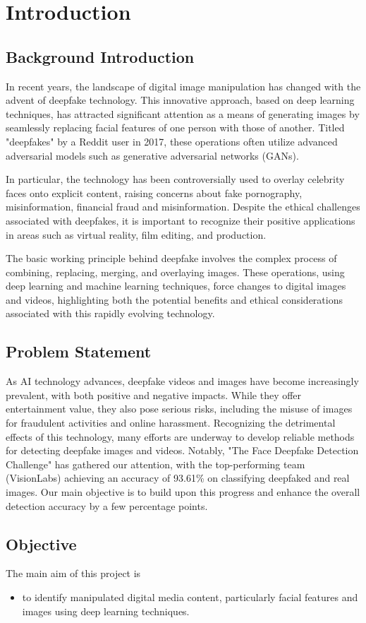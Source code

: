 \chapter{Introduction}
    \section{Background Introduction}
        In recent years, the landscape of digital image manipulation has changed with the advent of deepfake technology.
        This innovative approach, based on deep learning techniques, has attracted significant attention as a means of generating images by seamlessly replacing facial features of one person with those of another.
        Titled "deepfakes" by a Reddit user in 2017, these operations often utilize advanced adversarial models such as generative adversarial networks (GANs). \cite{st2022deep}

        In particular, the technology has been controversially used to overlay celebrity faces onto explicit content, raising concerns about fake pornography, misinformation, financial fraud and misinformation.
        Despite the ethical challenges associated with deepfakes, it is important to recognize their positive applications in areas such as virtual reality, film editing, and production.

        The basic working principle behind deepfake involves the complex process of combining, replacing, merging,  and overlaying images.
        These operations, using deep learning and machine learning techniques, force changes to digital images and videos, highlighting both the potential benefits and ethical considerations associated with this rapidly evolving technology.


    \section{Problem Statement}
        As AI technology advances, deepfake videos and images have become increasingly prevalent, with both positive and negative impacts. While they offer entertainment value, they also pose serious risks, including the misuse of images for fraudulent activities and online harassment. Recognizing the detrimental effects of this technology, many efforts are underway to develop reliable methods for detecting deepfake images and videos. Notably, "The Face Deepfake Detection Challenge" \cite{jimaging8100263} has gathered our attention, with the top-performing team (VisionLabs) achieving an accuracy of 93.61\% on classifying deepfaked and real images. Our main objective is to build upon this progress and enhance the overall detection accuracy by a few percentage points.

    \section{Objective}
        The main aim of this project is 
        \begin{itemize}
            \item to identify manipulated digital media content, particularly facial features and images using deep learning techniques.
        \end{itemize}